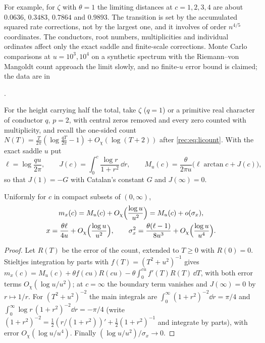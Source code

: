 For example, for $\zeta$ with $\theta=1$ the limiting distances at $c=1,2,3,4$ are about $0.0636$,
$0.3483$, $0.7864$ and $0.9893$. The transition is set by the accumulated squared rate corrections,
not by the largest one, and it involves of order $n^{4/5}$ coordinates. The conductors, root numbers,
multiplicities and individual ordinates affect only the exact saddle and finite-scale corrections.
Monte Carlo comparisons at $u=10^3,10^4$ on a synthetic spectrum with the Riemann--von Mangoldt count
approach the limit slowly, and no finite-$u$ error bound is claimed; the data are in
\begin{center}
.
\end{center}

For the height carrying half the total, take $\zeta$ ($q=1$) or a primitive real character of conductor
$q$, $p=2$, with central zeros removed and every zero counted with multiplicity, and recall
the one-sided count $N(T)=\frac T{2\pi}(\log\frac{qT}{2\pi}-1)+O_\chi(\log(T+2))$ after \eqref{rec:eq:licount}. With the exact saddle $u$ put
\[
 \ell=\log\frac{qu}{2\pi},\qquad J(c)=\int_0^c\frac{\log r}{1+r^2}\,\dd r,\qquad
 M_u(c)=\frac\theta{2\pi u}\bigl(\ell\arctan c+J(c)\bigr),
\]
so that $J(1)=-G$ with Catalan's constant $G$ and $J(\infty)=0$.

\begin{lemma}\label{ana:lem:centring}
Uniformly for $c$ in compact subsets of $(0,\infty)$,
\begin{gather*}
 m_x(c)=M_u(c)+O_\chi\Bigl(\frac{\log u}{u^2}\Bigr)=M_u(c)+o(\sigma_x),\\
 x=\frac{\theta\ell}{4u}+O_\chi\Bigl(\frac{\log u}{u^2}\Bigr),\qquad
 \sigma_x^2=\frac{\theta(\ell-1)}{8u^3}+O_\chi\Bigl(\frac{\log u}{u^4}\Bigr).
\end{gather*}
\end{lemma}

\begin{proof}
Let $R(T)$ be the error of the count, extended to $T\ge0$ with $R(0)=0$. Stieltjes integration by
parts with $f(T)=(T^2+u^2)^{-1}$ gives $m_x(c)=M_u(c)+\theta f(cu)R(cu)-\theta\int_0^{cu}f'(T)R(T)\,\dd T$,
with both error terms $O_\chi(\log u/u^2)$; at $c=\infty$ the boundary term vanishes and $J(\infty)=0$
by $r\mapsto1/r$. For $(T^2+u^2)^{-2}$ the main integrals are $\int_0^\infty(1+r^2)^{-2}\dd r=\pi/4$ and
$\int_0^\infty\log r\,(1+r^2)^{-2}\dd r=-\pi/4$ (write $(1+r^2)^{-2}=\frac12(r/(1+r^2))'+\frac12(1+r^2)^{-1}$
and integrate by parts), with error $O_\chi(\log u/u^4)$. Finally $(\log u/u^2)/\sigma_x\to0$.
\end{proof}

